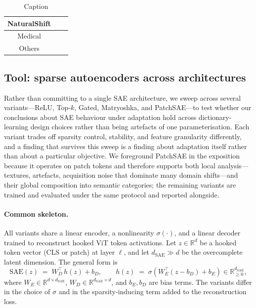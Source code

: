 \begin{table}[h]
    \centering
    \begin{tabular}{|c|c|c|}
    \hline
       NaturalShift  &  & \\
    \hline
       Medical  &  & \\
    \hline
       Others  &  & \\
    \hline
    \end{tabular}
    \caption{Caption}
    \label{datasetTable}
\end{table}


\subsection{Tool: sparse autoencoders across architectures}
\label{sec:method-tool}

Rather than committing to a single SAE architecture, we sweep across
several variants---ReLU, Top-$k$, Gated, Matryoshka, and PatchSAE---to
test whether our conclusions about SAE behaviour under adaptation hold
across dictionary-learning design choices rather than being artefacts of
one parameterisation. Each variant trades off sparsity control, stability,
and feature granularity differently, and a finding that survives this
sweep is a finding about adaptation itself rather than about a particular
objective. We foreground PatchSAE in the exposition because it operates
on patch tokens and therefore supports both local analysis---textures,
artefacts, acquisition noise that dominate many domain shifts---and their
global composition into semantic categories; the remaining variants are
trained and evaluated under the same protocol and reported alongside.

\paragraph{Common skeleton.}
All variants share a linear encoder, a nonlinearity $\sigma(\cdot)$, and
a linear decoder trained to reconstruct hooked ViT token activations. Let
$z \in \mathbb{R}^d$ be a hooked token vector (CLS or patch) at layer
$\ell$, and let $d_{\mathrm{SAE}} \gg d$ be the overcomplete latent
dimension. The general form is
\begin{equation}
\mathrm{SAE}(z) \;=\; W_D^{\top}\,h(z) + b_D,
\qquad
h(z) \;=\; \sigma\!\left(W_E^{\top}(z - b_D) + b_E\right)
\in \mathbb{R}^{d_{\mathrm{SAE}}}_{\geq 0},
\label{eq:sae-general}
\end{equation}
where $W_E \in \mathbb{R}^{d \times d_{\mathrm{SAE}}}$,
$W_D \in \mathbb{R}^{d_{\mathrm{SAE}} \times d}$, and $b_E, b_D$ are
bias terms. The variants differ in the choice of $\sigma$ and in the
sparsity-inducing term added to the reconstruction loss.

